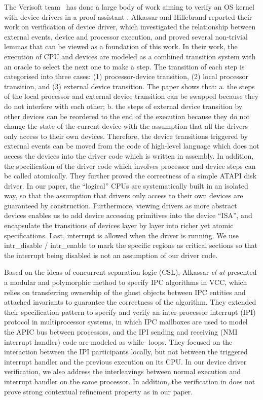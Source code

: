 The Verisoft team~\cite{verisoft07} has done a large body of work
aiming to verify an OS kernel with device drivers in a proof assistant
\cite{Alkassar:OSVE09,Alkassar:VSTTE08-225,Alkassar:VSTTE2010-71}.
Alkassar and Hillebrand \cite{Alkassar:VSTTE08-225} reported
their work on verification of device
driver, which investigated the relationship between external events, device
and processor execution, and proved several non-trivial lemmas that can be
viewed as a foundation of this work. In their work, the execution of CPU and
devices are modeled as a combined transition system with an oracle to select
the next one to make a step. The transition of each step is categorised into
three cases: (1) processor-device transition, (2) local processor transition,
and (3) external device transition. The paper shows that: a. the steps of the
local processor and external device transition can be swapped because they do
not interfere with each other; b. the steps of external device transition by
other devices can be reordered to the end of the execution because they do not
change the state of the current device with the assumption that all the
drivers only access to their own devices. Therefore, the device transitions
triggered by external events can be moved from the code of high-level language
which does not access the devices into the driver code which is written in
assembly. In addition, the specification of the driver code which involves
processor and device steps can be called atomically. They further proved the
correctness of a simple ATAPI disk driver.
In our paper, the ``logical'' CPUs are systematically built in an isolated way,
so that the assumption that drivers only access to their own devices are
guaranteed by construction. Furthermore, viewing drivers as more abstract devices
enables us to add device accessing primitives into the device “ISA”, and
encapsulate the transitions of devices layer by layer into richer yet atomic
specifications. Last, interrupt is allowed when the driver is running. We use
\textsf{intr\_disable} / \textsf{intr\_enable} to mark the specific regions
as critical sections
so that the interrupt being disabled is not an assumption of our driver code.

Based on the ideas of concurrent separation logic (CSL), Alkassar {\em el at}
\cite{Alkassar:IPC}
presented a modular and polymorphic method to specify IPC algorithms in VCC,
which relies on transferring ownership of the ghost objects between IPC
entities and attached invariants to guarantee the correctness of the
algorithm. They extended their specification pattern to specify and verify an
inter-processor interrupt (IPI) protocol in multiprocessor systems, in which
IPC mailboxes are used to model the APIC bus between processors, and the IPI
sending and receiving (NMI interrupt handler) code are modeled as while-
loops. They focused on the interaction between the IPI participants locally,
but not between the triggered interrupt handler and the previous execution on
its CPU. In our device driver verification, we also address the interleavings
between normal execution and interrupt handler on the same processor.
In addition, the verification in \cite{Alkassar:IPC} does not
prove strong contextual refinement property as in our paper.

